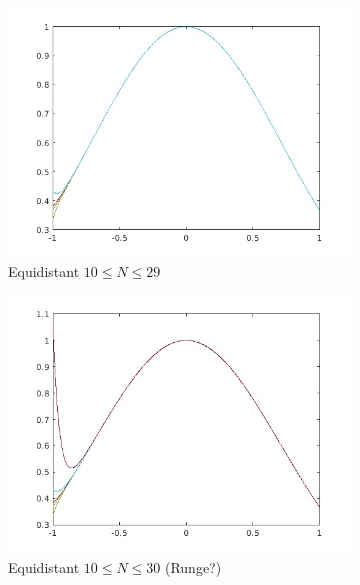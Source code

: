 \documentclass{article}
\begin{document}
\begin{figure}[H]
    \centering
    \begin{subfigure}[b]{0.4\linewidth}
	\includegraphics[width=\linewidth]{f2_equi.jpg}
        \caption{Equidistant $10 \le N \le 29$}
    \end{subfigure}
    \begin{subfigure}[b]{0.4\linewidth}
	\includegraphics[width=\linewidth]{f2_equi_runge.jpg}
        \caption{Equidistant $10 \le N \le 30$ (Runge?)}
    \end{subfigure}
    \begin{subfigure}[b]{0.4\linewidth}

\end{subfigure}
\end{figure}
\end{document}
